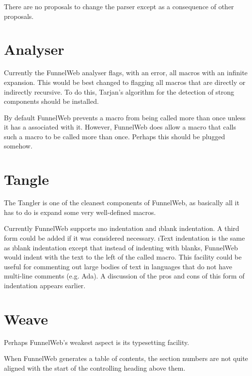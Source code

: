 There are no proposals to change the parser except as a consequence of
other proposals.

\section{Analyser}

 Currently the FunnelWeb analyser flags, with
an error, all macros with an infinite expansion. This would be best
changed to flagging all macros that are directly or indirectly recursive.
To do this, Tarjan's algorithm
for the detection of strong components should
be installed.

 By default FunnelWeb prevents a macro from being
called more than once unless it has a  associated with it. However,
FunnelWeb does allow a macro that calls such a macro to be called more
than once. Perhaps this  should be plugged somehow.

  
\section{Tangle}

The Tangler is one of the cleanest components of FunnelWeb, as basically all it
has to do is expand some very well-defined macros.

 Currently FunnelWeb supports \i{no indentation}
and \i{blank indentation}. A third form could be added if it was considered
necessary. \i{Text indentation} is the same as \i{blank indentation} except
that instead of indenting with blanks, FunnelWeb would indent with the
text to the left of the called macro. This facility could be useful for
commenting out large bodies of text in languages that do not have
multi-line comments (e.g. Ada). A discussion of the pros and cons of this
form of indentation appears earlier.

\section{Weave}

Perhaps FunnelWeb's weakest aspect is its typesetting facility.


 When FunnelWeb generates a table of contents,
the section numbers are not quite aligned with the start of the controlling
heading above them.

